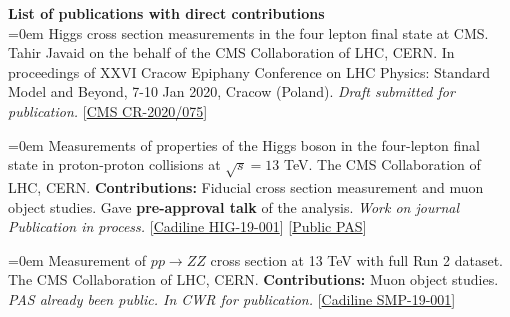 \newcommand{\MarginText}[1]{\marginpar{\raggedleft\itshape\small#1}}
\newcommand{\NewPublication}[4]{\noindent\hangindent=0em\hangafter=0 \MarginText{\color{black} #1}{\footnotesize [{\color{blue}#2}]} #3 {\footnotesize\color{ballblue}#4}\vspace{0.5em}}

\large\textbf{\color{electricultramarine} List of publications with direct contributions}\\

\NewPublication{}{5}{Higgs cross section measurements in the four lepton final state at CMS.}{\newline Tahir Javaid on the behalf of the CMS Collaboration of LHC, CERN.\newline %
In proceedings of XXVI Cracow Epiphany Conference on LHC Physics: Standard Model and Beyond, 7-10 Jan 2020, Cracow (Poland).\newline
	{\color{black}\textit{Draft submitted for publication.}}
[\href{http://cms.cern.ch/iCMS/jsp/db_notes/showNoteDetails.jsp?noteID=CMS\%20CR-2020/075}{CMS CR-2020/075}]
{\color{black}}}

\NewPublication{}{4}{Measurements of properties of the Higgs boson in the four-lepton final state in proton-proton collisions at $\sqrt{s} = 13$ TeV.}{The CMS Collaboration of LHC, CERN.\newline %
\textbf{Contributions:} Fiducial cross section measurement and muon object studies. Gave \textbf{pre-approval talk} of the analysis. \newline
        {\color{black}\textit{Work on journal Publication in process.}}
[\href{http://cms.cern.ch/iCMS/analysisadmin/cadilines?id=2200&ancode=HIG-19-001&tp=an&line=HIG-19-001}{Cadiline HIG-19-001}]
[\href{https://cds.cern.ch/record/2668684}{Public PAS}]
{\color{black}}}

\NewPublication{}{3}{Measurement of $pp\rightarrow ZZ$ cross section at 13 TeV with full Run 2 dataset.}{%
The CMS Collaboration of LHC, CERN.\newline
\textbf{Contributions:} Muon object studies.\newline
        {\color{black}\textit{ PAS already been public. In CWR for publication.}}
[\href{http://cms.cern.ch/iCMS/analysisadmin/cadilines?line=SMP-19-001&tp=an&id=2210&ancode=SMP-19-001}{Cadiline SMP-19-001}]
{\color{black}}}

